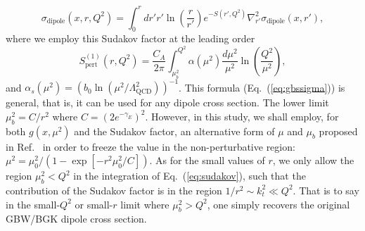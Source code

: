 \documentclass{appolb}
\begin{document}
\begin{equation}
    \sigma_{\mathrm{dipole}}(x,r,Q^2) =\int^r _0 d {r'}   {r'}  \ln\left(\frac{r}{{r'} }\right)  e^{-S({r'} ,Q^2)} \nabla^2_{{r'} }\sigma_{\mathrm{dipole}}(x,{r'} ),
    \label{eq:gbssigma}
\end{equation}
where we employ this Sudakov factor at the leading order~\cite{Xiao:2017yya}
\begin{equation}
    S^{(1)}_\mathrm{pert}(r,Q^2)=\frac{C_A }{2 \pi} \int^{Q^2}_{\mu_b^2  } \alpha(\mu^2 )\frac{d \mu^2}{\mu^2}  \ln\left(\frac{Q^2}{\mu^2}\right),
    \label{eq:sudakov}
\end{equation}
and
 $\alpha_s(\mu^2)=\left(b_0 \ln\left(\mu^2/\Lambda^2_\text{QCD}\right) \right)^{-1}$. This formula (Eq.~(\ref{eq:gbssigma})) is general, that is, it can be used for any dipole cross section.
The lower limit $\mu_b^2=C/r^2$ where $C=(2e^{-\gamma_E})^2$. %
However, in this study, we shall employ, for both $g(x,\mu^2)$ and the Sudakov factor, an alternative form of $\mu$ and $\mu_b$ proposed in Ref.~\cite{Golec-Biernat:2017lfv} in order to freeze the value in the non-perturbative region: $
    \mu^2= \mu_0^2/(1-\exp[{-r^2 \mu_0^2 / C  }]).
$
As for the small values of $r$, we only allow the region $\mu_b^2<Q^2$  in the integration of Eq.~(\ref{eq:sudakov}), such that the contribution of the Sudakov factor is in the region $1/r^2\sim k^2_t\ll Q^2$. That is to say in the small-$Q^2$ or small-$r$ limit where $\mu_b^2>Q^2$, one simply recovers the original GBW/BGK dipole cross section. 
\end{document}
